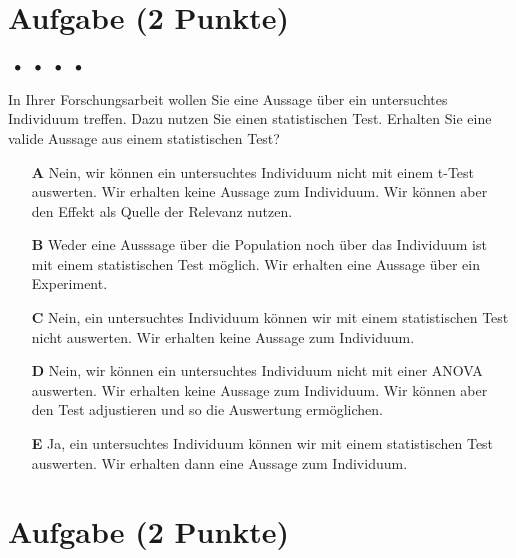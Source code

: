 \documentclass[a4paper, 9pt]{scrartcl}\usepackage[]{graphicx}\usepackage[]{xcolor}
\begin{document}
\section{Aufgabe \hfill (2 Punkte)}

\ifcollection
\begin{flushright}
\tiny\vspace{-2Ex}
\textbf{\examinhaltstart}
\exammodulemathstat $\;\bullet$
\exammodulestat $\;\bullet$
\exammodulestatbbv $\;\bullet$
\exammodulestatversuch $\;\bullet$
\exammodulebiostat
\vspace{-1Ex}
\end{flushright}
\fi




In Ihrer Forschungsarbeit wollen Sie eine Aussage über ein untersuchtes Individuum treffen. Dazu nutzen Sie einen statistischen Test. Erhalten Sie eine valide Aussage aus einem statistischen Test?



\begin{enumerate}
\item [\textbf{A} \msquare] Nein, wir können ein untersuchtes Individuum nicht mit einem t-Test auswerten. Wir erhalten keine Aussage zum Individuum. Wir können aber den Effekt als Quelle der Relevanz nutzen.
\item [\textbf{B} \msquare] Weder eine Ausssage über die Population noch über das Individuum ist mit einem statistischen Test möglich. Wir erhalten eine Aussage über ein Experiment.
\item [\textbf{C} \msquare] Nein, ein untersuchtes Individuum können wir mit einem statistischen Test nicht auswerten. Wir erhalten keine Aussage zum Individuum.
\item [\textbf{D} \msquare] Nein, wir können ein untersuchtes Individuum nicht mit einer ANOVA auswerten. Wir erhalten keine Aussage zum Individuum. Wir können aber den Test adjustieren und so die Auswertung ermöglichen.
\item [\textbf{E} \msquare] Ja, ein untersuchtes Individuum können wir mit einem statistischen Test auswerten. Wir erhalten dann eine Aussage zum Individuum.
\end{enumerate}

\section{Aufgabe \hfill (2 Punkte)}
\end{document}
